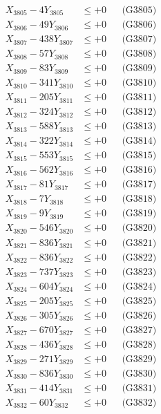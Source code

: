 \documentclass[a4paper,10pt]{article}
\begin{document}
{\begin{align}
X_{3805} - 4Y_{3805} &\leq +0 && \text{(G3805)} \\
X_{3806} - 49Y_{3806} &\leq +0 && \text{(G3806)} \\
X_{3807} - 438Y_{3807} &\leq +0 && \text{(G3807)} \\
X_{3808} - 57Y_{3808} &\leq +0 && \text{(G3808)} \\
X_{3809} - 83Y_{3809} &\leq +0 && \text{(G3809)} \\
X_{3810} - 341Y_{3810} &\leq +0 && \text{(G3810)} \\
\allowbreak
X_{3811} - 205Y_{3811} &\leq +0 && \text{(G3811)} \\
X_{3812} - 324Y_{3812} &\leq +0 && \text{(G3812)} \\
X_{3813} - 588Y_{3813} &\leq +0 && \text{(G3813)} \\
X_{3814} - 322Y_{3814} &\leq +0 && \text{(G3814)} \\
X_{3815} - 553Y_{3815} &\leq +0 && \text{(G3815)} \\
X_{3816} - 562Y_{3816} &\leq +0 && \text{(G3816)} \\
X_{3817} - 81Y_{3817} &\leq +0 && \text{(G3817)} \\
X_{3818} - 7Y_{3818} &\leq +0 && \text{(G3818)} \\
X_{3819} - 9Y_{3819} &\leq +0 && \text{(G3819)} \\
X_{3820} - 546Y_{3820} &\leq +0 && \text{(G3820)} \\
\allowbreak
X_{3821} - 836Y_{3821} &\leq +0 && \text{(G3821)} \\
X_{3822} - 836Y_{3822} &\leq +0 && \text{(G3822)} \\
X_{3823} - 737Y_{3823} &\leq +0 && \text{(G3823)} \\
X_{3824} - 604Y_{3824} &\leq +0 && \text{(G3824)} \\
X_{3825} - 205Y_{3825} &\leq +0 && \text{(G3825)} \\
X_{3826} - 305Y_{3826} &\leq +0 && \text{(G3826)} \\
X_{3827} - 670Y_{3827} &\leq +0 && \text{(G3827)} \\
X_{3828} - 436Y_{3828} &\leq +0 && \text{(G3828)} \\
X_{3829} - 271Y_{3829} &\leq +0 && \text{(G3829)} \\
X_{3830} - 836Y_{3830} &\leq +0 && \text{(G3830)} \\
\allowbreak
X_{3831} - 414Y_{3831} &\leq +0 && \text{(G3831)} \\
X_{3832} - 60Y_{3832} &\leq +0 && \text{(G3832)} \\

\end{align}}
\end{document}
